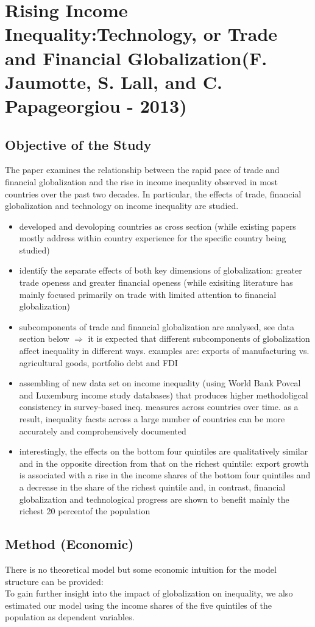 \section{Rising Income Inequality:Technology, or Trade and Financial Globalization(F. Jaumotte, S. Lall, and C. Papageorgiou - 2013)}
\subsection{Objective of the Study}
The paper examines the relationship between the rapid pace of trade and financial globalization and the rise in income inequality observed in most countries over the past two decades. In particular, the effects of trade, financial globalization and technology on income inequality are studied.
\begin{itemize}
\item developed and devoloping countries as cross section (while existing papers mostly address within country experience for the specific country being studied)
\item identify the separate effects of both key dimensions of globalization: greater trade openess and greater financial openess (while exisiting literature has mainly focused primarily on trade with limited attention to financial globalization)
\item subcomponents of trade and financial globalization are analysed, see data section below $\Rightarrow$ it is expected that different subcomponents of globalization affect inequality in different ways.  examples are: exports of manufacturing vs. agricultural goods, portfolio debt and FDI
\item assembling of new data set on income inequality (using World Bank Povcal and Luxemburg income study databases) that produces higher methodoligcal consistency in survey-based ineq. measures across countries over time. as a result, inequality facsts across a large number of countries can be more accurately and comprohensively documented
\item interestingly, the effects on the bottom four quintiles are qualitatively similar and in the opposite direction from that on the richest quintile: export growth is associated with a rise in the income shares of the bottom four quintiles and a decrease
in the share of the richest quintile and, in contrast, financial globalization and technological progress are shown to benefit mainly the richest 20 percentof the population
\end{itemize}
\subsection{Method (Economic)}
There is no theoretical model but some economic intuition for the model structure can be provided:\\
To gain further insight into the impact of globalization on inequality, we also estimated our model using the income shares of the five quintiles of the population as dependent variables. 
